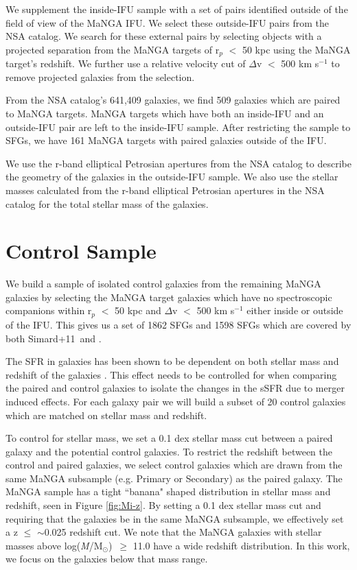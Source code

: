 \documentclass[iop,revtex4,twocolumn,apj,numberedappendix,appendixfloats]{emulateapj}
\newcommand{\logm}{log({\it M}/M$_{\odot}$)}
\newcommand{\simard}{Simard+11}
\begin{document}
We supplement the inside-IFU sample with a set of pairs identified outside of the field of view of the MaNGA IFU. We select these outside-IFU pairs from the NSA catalog. We search for these external pairs by selecting objects with a projected separation from the MaNGA targets of r$_p$ $<$ 50 kpc using the MaNGA target's redshift. We further use a relative velocity cut of $\Delta$v $<$ 500 km s$^{-1}$ to remove projected galaxies from the selection. 

From the NSA catalog's 641,409 galaxies, we find 509 galaxies which are paired to MaNGA targets. MaNGA targets which have both an inside-IFU and an outside-IFU pair are left to the inside-IFU sample. After restricting the sample to SFGs, we have 161 MaNGA targets with paired galaxies outside of the IFU.

We use the r-band elliptical Petrosian apertures from the NSA catalog to describe the geometry of the galaxies in the outside-IFU sample. We also use the stellar masses calculated from the r-band elliptical Petrosian apertures in the NSA catalog for the total stellar mass of the galaxies. 

\section{Control Sample}\label{sec:control}
We build a sample of isolated control galaxies from the remaining MaNGA galaxies by selecting the MaNGA target galaxies which have no spectroscopic companions within r$_p$ $<$ 50 kpc and $\Delta$v $<$ 500 km s$^{-1}$ either inside or outside of the IFU. This gives us a set of 1862 SFGs and 1598 SFGs which are covered by both \simard\ and \citet{Mendel:2014}. 

The SFR in galaxies has been shown to be dependent on both stellar mass and redshift of the galaxies \citep{Noeske:2007}. This effect needs to be controlled for when comparing the paired and control galaxies to isolate the changes in the sSFR due to merger induced effects. For each galaxy pair we will build a subset of 20 control galaxies which are matched on stellar mass and redshift. 

To control for stellar mass, we set a 0.1 dex stellar mass cut between a paired galaxy and the potential control galaxies. To restrict the redshift between the control and paired galaxies, we select control galaxies which are drawn from the same MaNGA subsample (e.g. Primary or Secondary) as the paired galaxy. The MaNGA sample has a tight ``banana" shaped distribution in stellar mass and redshift, seen in Figure \ref{fig:Mi-z}. By setting a 0.1 dex stellar mass cut and requiring that the galaxies be in the same MaNGA subsample, we effectively set a z $\le$ $\sim$0.025 redshift cut. We note that the MaNGA galaxies with stellar masses above \logm\ $\ge$ 11.0 have a wide redshift distribution. In this work, we focus on the galaxies below that mass range. 
\end{document}
